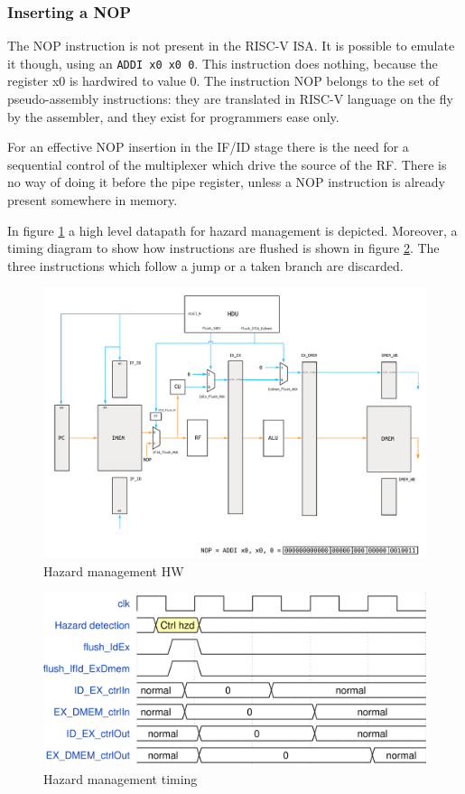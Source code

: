 \documentclass[a4paper]{article}
\begin{document}
\subsubsection{Inserting a NOP} 
The NOP instruction is not present in the RISC-V ISA. It is possible to emulate it though, using an \texttt{ADDI x0 x0 0}. This instruction does nothing, because the register x0 is hardwired to value 0. The instruction NOP belongs to the set of pseudo-assembly instructions: they are translated in RISC-V language on the fly by the assembler, and they exist for programmers ease only.

For an effective NOP insertion in the IF/ID stage there is the need for a sequential control of the multiplexer which drive the source of the RF. There is no way of doing it before the pipe register, unless a NOP instruction is already present somewhere in memory.

In figure \ref{fig:hzd_management} a high level datapath for hazard management is depicted. Moreover, a timing diagram to show how instructions are flushed is shown in figure \ref{fig:hzd_management_timing}. The three instructions which follow a jump or a taken branch are discarded. 

\begin{figure}[hbtp]
    \centering
    \includegraphics[scale=0.5]{../hzd_management/ref/schematic/hzd_management.pdf}
    \caption{Hazard management HW}
    \label{fig:hzd_management}
\end{figure}

\begin{figure}[hbtp]
    \centering
    \includegraphics[scale=0.8]{../hzd_management/ref/timing/hzd_management_timing.png}
    \caption{Hazard management timing}
    \label{fig:hzd_management_timing}
\end{figure}
\end{document}
